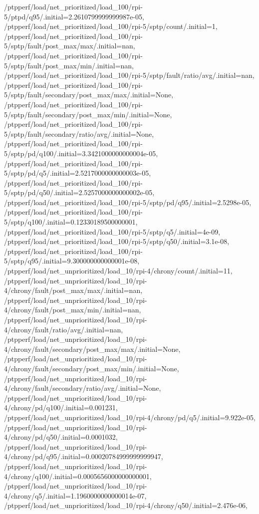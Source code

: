 {    /ptpperf/load/net_prioritized/load_100/rpi-5/ptpd/q95/.initial=2.2610799999999987e-05,
    /ptpperf/load/net_prioritized/load_100/rpi-5/sptp/count/.initial=1,
    /ptpperf/load/net_prioritized/load_100/rpi-5/sptp/fault/post_max/max/.initial=nan,
    /ptpperf/load/net_prioritized/load_100/rpi-5/sptp/fault/post_max/min/.initial=nan,
    /ptpperf/load/net_prioritized/load_100/rpi-5/sptp/fault/ratio/avg/.initial=nan,
    /ptpperf/load/net_prioritized/load_100/rpi-5/sptp/fault/secondary/post_max/max/.initial=None,
    /ptpperf/load/net_prioritized/load_100/rpi-5/sptp/fault/secondary/post_max/min/.initial=None,
    /ptpperf/load/net_prioritized/load_100/rpi-5/sptp/fault/secondary/ratio/avg/.initial=None,
    /ptpperf/load/net_prioritized/load_100/rpi-5/sptp/pd/q100/.initial=3.3421000000000004e-05,
    /ptpperf/load/net_prioritized/load_100/rpi-5/sptp/pd/q5/.initial=2.5217000000000003e-05,
    /ptpperf/load/net_prioritized/load_100/rpi-5/sptp/pd/q50/.initial=2.5257000000000002e-05,
    /ptpperf/load/net_prioritized/load_100/rpi-5/sptp/pd/q95/.initial=2.5298e-05,
    /ptpperf/load/net_prioritized/load_100/rpi-5/sptp/q100/.initial=0.12330189500000001,
    /ptpperf/load/net_prioritized/load_100/rpi-5/sptp/q5/.initial=4e-09,
    /ptpperf/load/net_prioritized/load_100/rpi-5/sptp/q50/.initial=3.1e-08,
    /ptpperf/load/net_prioritized/load_100/rpi-5/sptp/q95/.initial=9.300000000000001e-08,
    /ptpperf/load/net_unprioritized/load_10/rpi-4/chrony/count/.initial=11,
    /ptpperf/load/net_unprioritized/load_10/rpi-4/chrony/fault/post_max/max/.initial=nan,
    /ptpperf/load/net_unprioritized/load_10/rpi-4/chrony/fault/post_max/min/.initial=nan,
    /ptpperf/load/net_unprioritized/load_10/rpi-4/chrony/fault/ratio/avg/.initial=nan,
    /ptpperf/load/net_unprioritized/load_10/rpi-4/chrony/fault/secondary/post_max/max/.initial=None,
    /ptpperf/load/net_unprioritized/load_10/rpi-4/chrony/fault/secondary/post_max/min/.initial=None,
    /ptpperf/load/net_unprioritized/load_10/rpi-4/chrony/fault/secondary/ratio/avg/.initial=None,
    /ptpperf/load/net_unprioritized/load_10/rpi-4/chrony/pd/q100/.initial=0.001231,
    /ptpperf/load/net_unprioritized/load_10/rpi-4/chrony/pd/q5/.initial=9.922e-05,
    /ptpperf/load/net_unprioritized/load_10/rpi-4/chrony/pd/q50/.initial=0.0001032,
    /ptpperf/load/net_unprioritized/load_10/rpi-4/chrony/pd/q95/.initial=0.00020784999999999947,
    /ptpperf/load/net_unprioritized/load_10/rpi-4/chrony/q100/.initial=0.0005656000000000001,
    /ptpperf/load/net_unprioritized/load_10/rpi-4/chrony/q5/.initial=1.1960000000000014e-07,
    /ptpperf/load/net_unprioritized/load_10/rpi-4/chrony/q50/.initial=2.476e-06,
}
